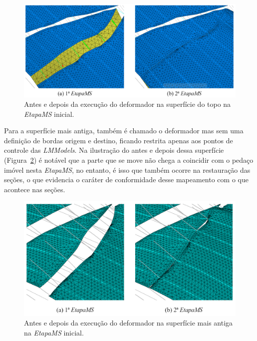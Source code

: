 \begin{figure} [H]
  \begin{center}
    \includegraphics[width=\textwidth]{images/fig-example-2-7}
    \caption{Antes e depois da execução do deformador na superfície do topo na \textit{EtapaMS} inicial.}\label{fig-example-2-7}
  \end{center}
\end{figure}

Para a superfície mais antiga, também é chamado o deformador mas sem uma definição de bordas origem e destino, ficando restrita apenas aos pontos de controle das \textit{LMModels}. Na ilustração do antes e depois dessa superfície (Figura~\ref{fig-example-2-8}) é notável que a parte que se move não chega a coincidir com o pedaço imóvel nesta \textit{EtapaMS}, no entanto, é isso que também ocorre na restauração das seções, o que evidencia o caráter de conformidade desse mapeamento com o que acontece nas seções.

\begin{figure} [H]
  \begin{center}
    \includegraphics[width=340pt]{images/fig-example-2-8}
    \caption{Antes e depois da execução do deformador na superfície mais antiga na \textit{EtapaMS} inicial.}\label{fig-example-2-8}
  \end{center}
\end{figure}

